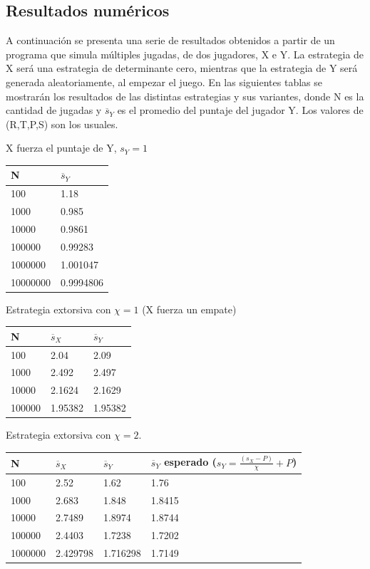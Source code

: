 \documentclass[11pt]{article}
\begin{document}
\subsection{Resultados numéricos}
A continuación se presenta una serie de resultados obtenidos a partir de un programa que simula múltiples jugadas, de dos
jugadores, X e Y. La estrategia de X será una estrategia de determinante cero, mientras que la estrategia de Y será 
generada aleatoriamente, al empezar el juego.
En las siguientes tablas se mostrarán los resultados de las distintas estrategias y sus variantes, donde N es la cantidad de
jugadas y $\overline s_Y$ es el promedio del puntaje del jugador Y. Los valores de (R,T,P,S) son los usuales.\newpage

X fuerza el puntaje de Y, $s_Y=1$
\begin{center}
  \begin{tabular}{| l | l |}
    \hline
    N & $\overline s_Y$ \\\hline
    100 & 1.18 \\\hline
    1000 & 0.985 \\\hline
    10000 & 0.9861 \\\hline
    100000 & 0.99283 \\\hline
    1000000 & 1.001047 \\\hline
    10000000 & 0.9994806 \\\hline
    
  \end{tabular}
\end{center}
Estrategia extorsiva con $\chi=1$ (X fuerza un empate)
\begin{center}
  \begin{tabular}{| l | l | l |}    
    \hline
    N & $\overline s_X$ & $\overline s_Y$ \\\hline
    100 & 2.04 & 2.09 \\\hline
    1000 & 2.492 & 2.497 \\\hline
    10000 & 2.1624 & 2.1629 \\\hline
    100000 & 1.95382 & 1.95382 \\\hline
  \end{tabular}
\end{center}
Estrategia extorsiva con $\chi=2$. 
\begin{center}
  \begin{tabular}{| l | l | l | l |}
    \hline
    N & $\overline s_X$ & $\overline
    s_Y$ & $\overline s_Y$ esperado ($s_Y=\frac{(s_X-P)}{\chi} + P$)\\\hline
    100 & 2.52 & 1.62 & 1.76\\\hline
    1000 & 2.683 & 1.848 & 1.8415  \\\hline
    10000 & 2.7489 & 1.8974 & 1.8744\\\hline
    100000 & 2.4403 & 1.7238 & 1.7202 \\\hline
    1000000 & 2.429798 & 1.716298 & 1.7149 \\\hline
  \end{tabular}
\end{center}
\end{document}
